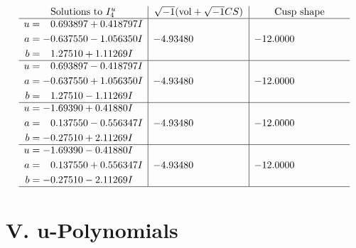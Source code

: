 \documentclass[1p]{elsarticle_modified}
\theoremstyle{definition}
\newcommand{\I}{\sqrt{-1}}
\begin{document}
$$\begin{array}{c|c|c}  
\text{Solutions to }I^u_{4}& \I (\text{vol} + \sqrt{-1}CS) & \text{Cusp shape}\\
 \hline 
\begin{aligned}
u &= \phantom{-}0.693897 + 0.418797 I \\
a &= -0.637550 - 1.056350 I \\
b &= \phantom{-}1.27510 + 1.11269 I\end{aligned}
 & -4.93480\phantom{ +0.000000I} & -12.0000\phantom{ +0.000000I} \\ \hline\begin{aligned}
u &= \phantom{-}0.693897 - 0.418797 I \\
a &= -0.637550 + 1.056350 I \\
b &= \phantom{-}1.27510 - 1.11269 I\end{aligned}
 & -4.93480\phantom{ +0.000000I} & -12.0000\phantom{ +0.000000I} \\ \hline\begin{aligned}
u &= -1.69390 + 0.41880 I \\
a &= \phantom{-}0.137550 - 0.556347 I \\
b &= -0.27510 + 2.11269 I\end{aligned}
 & -4.93480\phantom{ +0.000000I} & -12.0000\phantom{ +0.000000I} \\ \hline\begin{aligned}
u &= -1.69390 - 0.41880 I \\
a &= \phantom{-}0.137550 + 0.556347 I \\
b &= -0.27510 - 2.11269 I\end{aligned}
 & -4.93480\phantom{ +0.000000I} & -12.0000\phantom{ +0.000000I}\\
 \hline 
 \end{array}$$\newpage
\newpage\renewcommand{\arraystretch}{1}
\centering \section*{ V. u-Polynomials}
\end{document}
